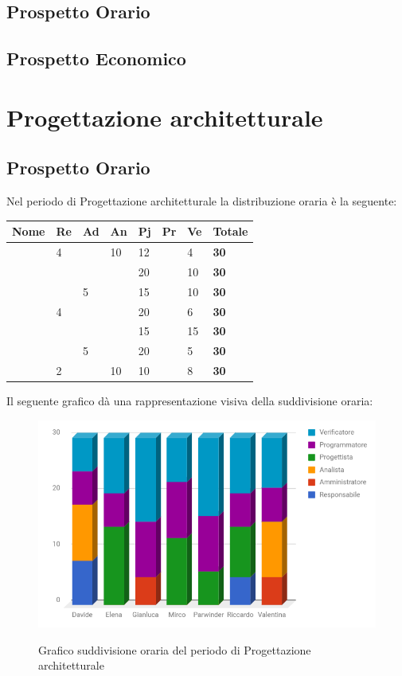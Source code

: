 \documentclass[PianoDiProgetto.tex]{subfiles}
\begin{document}
\subsection{Prospetto Orario}
\subsection{Prospetto Economico}

\section{Progettazione architetturale}
\subsection{Prospetto Orario}
Nel periodo di Progettazione architetturale la distribuzione oraria è la seguente:\\
\begin{table}[htbp]
	\centering
	\renewcommand\arraystretch{1.5}
	\begin{tabularx}{\textwidth}{p{4cm}|p{1cm}|p{1cm}|p{1cm}|p{1cm}|p{1cm}|p{1cm}|p{2cm}}
		\hline
		\textbf{Nome} & \textbf{Re} & \textbf{Ad} & \textbf{An} & \textbf{Pj} & \textbf{Pr} & \textbf{Ve} & \textbf{Totale} \\
		\hline
		\Davide & 4 & \ & 10 & 12 & \ & 4 & \textbf{30} \\
		\hline
		\Elena & \ & \ & \ & 20 & \ & 10 & \textbf{30} \\
		\hline
		\Gianluca & \ & 5 & \ & 15 & \ & 10 & \textbf{30} \\
		\hline
		\Mirco & 4 & \ & \ & 20 & \ & 6 & \textbf{30} \\
		\hline
		\Parwinder & \ & \ & \ & 15 & \ & 15 & \textbf{30} \\
		\hline
		\Riccardo & \ & 5 & \ & 20 & \ & 5 & \textbf{30} \\
		\hline
		\Valentina & 2 & \ & 10 & 10 & \ & 8 & \textbf{30} \\
		\hline
	\end{tabularx}
\end{table}
\newpage
Il seguente grafico dà una rappresentazione visiva della suddivisione oraria:
\begin{figure}
	\includegraphics[width=14.5cm]{images/prospettoOrario/progArch.png}
	\label{fig:foo}
	\caption{Grafico suddivisione oraria del periodo di Progettazione architetturale}
\end{figure} 
\newpage
\end{document}
